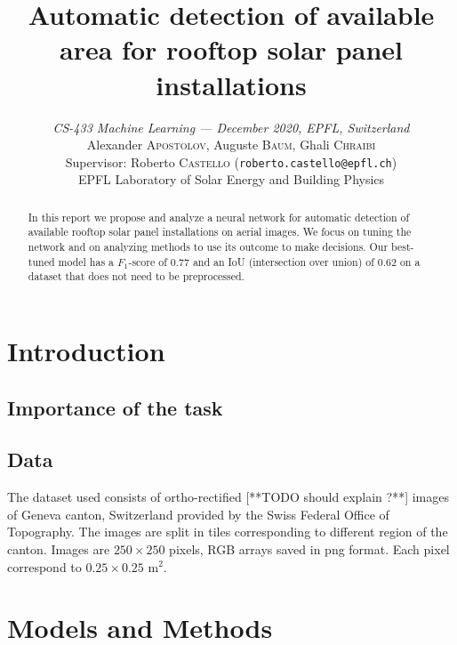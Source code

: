 \documentclass[10pt,conference]{IEEEtran}
\begin{document}
\title{{\LARGE Automatic detection of available area for rooftop solar panel installations}\vspace{-3mm}}    

\author{
  \textit{CS-433 Machine Learning --- December 2020, EPFL, Switzerland}\\
  Alexander \textsc{Apostolov}, Auguste \textsc{Baum}, Ghali \textsc{Chraibi}\\
  Supervisor: Roberto \textsc{Castello} (\texttt{roberto.castello@epfl.ch})\\ EPFL Laboratory of Solar Energy and Building Physics
}
\maketitle

\begin{abstract}
  In this report we propose and analyze a neural network for automatic detection of available rooftop solar panel installations on aerial images. We focus on tuning the network and on analyzing methods to use its outcome to make decisions. Our best-tuned model has a $F_1$-score of $0.77$ and an IoU (intersection over union) of $0.62$ on a dataset that does not need to be preprocessed.
\end{abstract}

\section{Introduction}
\subsection{Importance of the task}

\subsection{Data}
The dataset used consists of ortho-rectified [**TODO should explain ?**] images of Geneva canton, Switzerland provided by the Swiss Federal Office of Topography. The images are split in tiles corresponding to different region of the canton. Images are $250 \times 250$ pixels, RGB arrays saved in png format. Each pixel correspond to $0.25 \times 0.25 \text{ m}^2$.


\section{Models and Methods}
\end{document}
